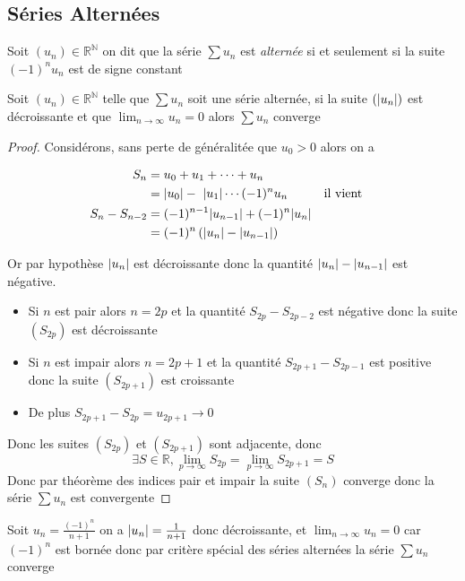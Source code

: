 \documentclass[11pt,colorlinks]{book}
\theoremstyle{mytheoremstyle}
\theoremstyle{mytheoremstyle}
\theoremstyle{mytheoremstyle}
\theoremstyle{mytheoremstyle}
\theoremstyle{mytheoremstyle}
\theoremstyle{mytheoremstyle}
\theoremstyle{mytheoremstyle}
\theoremstyle{mytheoremstyle}
\theoremstyle{myproblemstyle}
\def\mbb#1{\mathbb{#1}}
\def\bN{\mbb{N}}
\def\bR{\mbb{R}}
\def\ln{\lim_{n \to \infty}}
\def\rN{\bR^{\bN}}
\begin{document}
  \subsection{Séries Alternées}
  \begin{definition}
    Soit $(u_n) \in \rN$ on dit que la série $\sum u_n$ est \textit{alternée} si et seulement si la suite $(-1)^nu_n$ est de signe constant
  \end{definition}
  \begin{theorem}
    Soit $(u_n) \in \rN$ telle que $\sum u_n$ soit une série alternée, 
    si la suite $(\abs{u_n})$ est décroissante et que $\ln u_n = 0$ alors $\sum u_n$ converge
    \begin{proof}
      Considérons, sans perte de généralitée que $u_0 > 0$ alors on a 

      \begin{align*}
        S_n &= u_0 + u_1 + \cdots + u_n \\ 
         &= \abs{u_0} - \abs{u_1} \cdots (-1)^n u_n && \text{il vient} \\ 
        S_{n} - S_{n-2} &= (-1)^{n-1} \abs{u_{n-1}} + (-1)^n \abs{u_n} \\ 
        &= (-1)^n \left(\abs{u_n} - \abs{u_{n-1}}\right)
      \end{align*}
      
      Or par hypothèse $\abs{u_n}$ est décroissante donc la quantité $\abs{u_n} - \abs{u_{n-1}}$ est négative.\newline 
      \begin{itemize}
        \item Si $n$ est pair alors $n=2p$ et la quantité $S_{2p} - S_{2p-2}$ est négative donc la suite $(S_{2p})$ est décroissante
        \item Si $n$ est impair alors $n=2p+1$ et la quantité $S_{2p+1} - S_{2p-1}$ est positive donc la suite $(S_{2p+1})$ est croissante
        \item De plus $S_{2p+1}-S_{2p} = u_{2p+1} \to 0$ 
      \end{itemize}
      Donc les suites $(S_{2p})$ et $(S_{2p+1})$ sont adjacente, donc 
      \begin{equation}
        \exists S \in \bR, \lim_{p \to \infty} S_{2p} = \lim_{p \to \infty} S_{2p+1} = S
      \end{equation}
      Donc par théorème des indices pair et impair la suite $(S_n)$ converge donc la série $\sum u_n$ est convergente
    \end{proof}
  \end{theorem}
  \begin{ex}
    Soit $u_n = \frac{(-1)^n}{n+1}$ on a $\abs{u_n} = \frac{1}{n+1}$ donc décroissante, et $\ln u_n = 0$ car $(-1)^n$ est bornée
    donc par critère spécial des séries alternées la série $\sum u_n$ converge 
  \end{ex}
\end{document}
